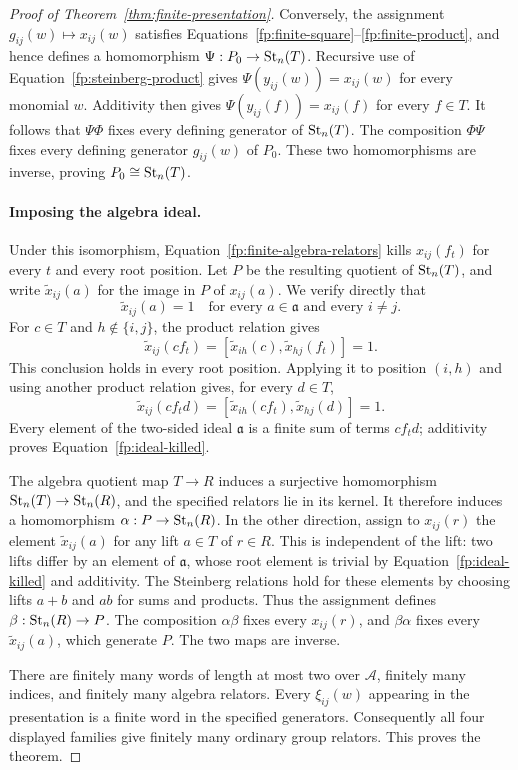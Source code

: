 \begin{proof}[Proof of Theorem~\ref{thm:finite-presentation}]
Conversely, the assignment $g_{ij}(w)\mapsto x_{ij}(w)$ satisfies
Equations~\eqref{fp:finite-square}--\eqref{fp:finite-product}, and
hence defines a homomorphism $\Psi:P_0\to\operatorname{St}_n(T)$.  Recursive use
of Equation~\eqref{fp:steinberg-product} gives
$\Psi(y_{ij}(w))=x_{ij}(w)$ for every monomial $w$.  Additivity then
gives $\Psi(y_{ij}(f))=x_{ij}(f)$ for every $f\in T$.  It follows
that $\Psi\Phi$ fixes every defining generator of $\operatorname{St}_n(T)$.
The composition $\Phi\Psi$ fixes every defining generator
$g_{ij}(w)$ of $P_0$.  These two homomorphisms are inverse, proving
$P_0\cong\operatorname{St}_n(T)$.

\paragraph{Imposing the algebra ideal.}
Under this isomorphism, Equation~\eqref{fp:finite-algebra-relators}
kills $x_{ij}(f_t)$ for every $t$ and every root position.  Let $P$ be
the resulting quotient of $\operatorname{St}_n(T)$, and write $\widetilde x_{ij}(a)$
for the image in $P$ of $x_{ij}(a)$.  We verify directly that
\begin{equation}
 \widetilde x_{ij}(a)=1
 \quad\text{for every }a\in\mathfrak a\text{ and every }i\neq j.
 \label{fp:ideal-killed}
\end{equation}
For $c\in T$ and $h\notin\{i,j\}$, the product relation gives
\[
 \widetilde x_{ij}(cf_t)
 =[\widetilde x_{ih}(c),\widetilde x_{hj}(f_t)]=1.
\]
This conclusion holds in every root position.  Applying it to
position $(i,h)$ and using another product relation gives, for every
$d\in T$,
\[
 \widetilde x_{ij}(cf_td)
 =[\widetilde x_{ih}(cf_t),\widetilde x_{hj}(d)]=1.
\]
Every element of the two-sided ideal $\mathfrak a$ is a finite sum of
terms $cf_td$; additivity proves Equation~\eqref{fp:ideal-killed}.

The algebra quotient map $T\to R$ induces a surjective homomorphism
$\operatorname{St}_n(T)\to\operatorname{St}_n(R)$, and the specified relators lie in its
kernel.  It therefore induces a homomorphism $\alpha:P\to\operatorname{St}_n(R)$.
In the other direction, assign to $x_{ij}(r)$ the element
$\widetilde x_{ij}(a)$ for any lift $a\in T$ of $r\in R$.
This is independent of the lift: two lifts differ by an element of
$\mathfrak a$, whose root element is trivial by
Equation~\eqref{fp:ideal-killed} and additivity.  The Steinberg
relations hold for these elements by choosing lifts $a+b$ and $ab$
for sums and products.  Thus the assignment defines
$\beta:\operatorname{St}_n(R)\to P$.  The composition $\alpha\beta$ fixes
every $x_{ij}(r)$, and $\beta\alpha$ fixes every
$\widetilde x_{ij}(a)$, which generate $P$.  The two maps are inverse.

There are finitely many words of length at most two over $\mathcal A$,
finitely many indices, and finitely many algebra relators.  Every
$\xi_{ij}(w)$ appearing in the presentation is a finite word in the
specified generators.  Consequently all four displayed families give
finitely many ordinary group relators.  This proves the theorem.
\end{proof}

